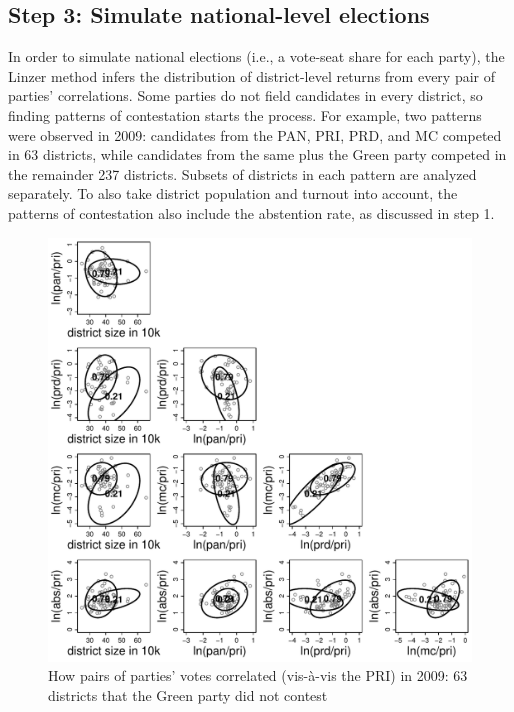 \documentclass[letter,12pt]{article}
\begin{document}
\subsection*{Step 3: Simulate national-level elections}

In order to simulate national elections (i.e., a vote-seat share for each party), the Linzer method infers the distribution of district-level returns from every pair of parties' correlations. Some parties do not field candidates in every district, so finding patterns of contestation starts the process. For example, two patterns were observed in 2009: candidates from the PAN, PRI, PRD, and MC competed in 63 districts, while candidates from the same plus the Green party competed in the remainder 237 districts. Subsets of districts in each pattern are analyzed separately. To also take district population and turnout into account, the patterns of contestation also include the abstention rate, as discussed in step 1. 

\begin{figure}
\centering 
  \includegraphics[width=.8\columnwidth]{linzerCorrelat2009.pdf} 
  \caption{How pairs of parties' votes correlated (vis-\`a-vis the PRI) in 2009: 63 districts that the Green party did not contest}\label{F:linzerCorr}
\end{figure}
\end{document}
